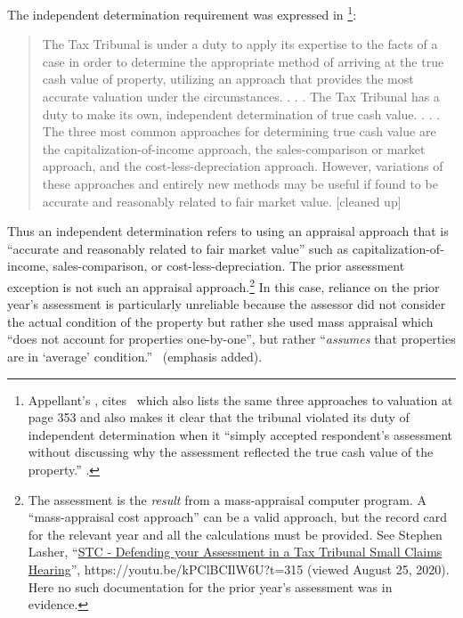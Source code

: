 \documentclass[12pt,\documentclassflag]{michiganCourtOfAppealsBrief}
\begin{document}
The independent determination requirement was expressed in \footnote{Appellant's , cites \cite{Jones & Laughlin}\ which also lists the same three approaches to valuation at page 353 and also makes it clear that the tribunal violated its duty of independent determination when it ``simply accepted respondent's  assessment without discussing why the assessment reflected the true cash value of the property.'' .}:

\begin{quotation}
  The Tax Tribunal is under a duty to apply its expertise to the facts of a case in order to determine the appropriate method of arriving at the true cash value of property, utilizing an approach that provides the most accurate valuation under the circumstances. . . .
  The Tax Tribunal has a duty to make its own, independent determination of true cash value. . . .
  The three most common approaches for determining true cash value are the capitalization-of-income approach, the sales-comparison or market approach, and the cost-less-depreciation approach. However, variations of these approaches and entirely new methods may be useful if found to be accurate and reasonably related to fair market value. [cleaned up]
\end{quotation}

Thus an independent determination refers to using an appraisal approach that is ``accurate and reasonably related to fair market value'' such as capitalization-of-income, sales-comparison, or cost-less-depreciation. The prior assessment exception is not such an appraisal approach.\footnote{The assessment is the \emph{result} from a mass-appraisal computer program. A ``mass-appraisal cost approach'' can be a valid approach, but the record card for the relevant year and all the calculations must be provided. See Stephen Lasher, ``\href{https://youtu.be/kPClBCIlW6U?t=315}{STC - Defending your Assessment in a Tax Tribunal Small Claims Hearing}'', https://youtu.be/kPClBCIlW6U?t=315 (viewed August 25, 2020). Here no such documentation for the prior year's assessment was in evidence.} In this case, reliance on the prior year's assessment is particularly unreliable because the assessor did not consider the actual condition of the property but rather she used mass appraisal which ``does not account for properties one-by-one'', but rather ``{\em assumes} that properties are in `average' condition.'' \ (emphasis added).
 
\end{document}
